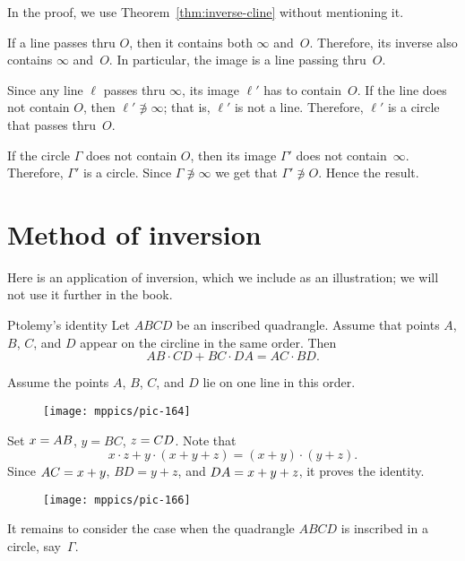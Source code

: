 In the proof, we use Theorem~\ref{thm:inverse-cline} without mentioning it.

If a line passes thru $O$, then it contains both $\infty$ and~$O$.
Therefore, its inverse also contains $\infty$ and~$O$.
In particular, the image is a line passing thru~$O$.

Since any line $\ell$ passes thru $\infty$, its image $\ell'$ has to contain~$O$.
If the line does not contain $O$, 
then $\ell'\not\ni \infty$;
that is, $\ell'$ is not a line.
Therefore, $\ell'$ is a circle that passes thru~$O$. 

If the circle $\Gamma$ does not contain $O$, 
then its image $\Gamma'$ does not contain~$\infty$.
Therefore, $\Gamma'$ is a circle.
Since  $\Gamma\not\ni\infty$ we get that $\Gamma' \not\ni O$.
Hence the result.
\qeds

\section{Method of inversion}

Here is an application of inversion,
which we include as an illustration;
we will not use it further in the book.

\begin{thm}{Ptolemy's identity}\label{ptolemy-id}
Let $ABCD$ be an inscribed quadrangle.
Assume that points $A$, $B$, $C$, and $D$ appear on the circline in the same order.
Then 
$$ AB\cdot CD+ BC\cdot DA=AC\cdot BD.$$

\end{thm}

Assume the points $A$, $B$, $C$, and $D$ lie on one line in this order.

\begin{wrapfigure}{o}{39mm}
\centering
\texttt{[image: mppics/pic-164]}
\end{wrapfigure}

Set $x=AB$, $y=BC$, $z=CD$.
Note that
$$x\cdot z+y\cdot (x+y+z)=(x+y)\cdot(y+z).$$
Since $AC=x+y$, $BD=y+z$, and $DA=x+y+z$,
it proves the identity.

\begin{wrapfigure}{o}{39mm}
\centering
\texttt{[image: mppics/pic-166]}
\end{wrapfigure}

It remains to consider the case when the quadrangle $ABCD$ is inscribed in a circle, say~$\Gamma$. 

